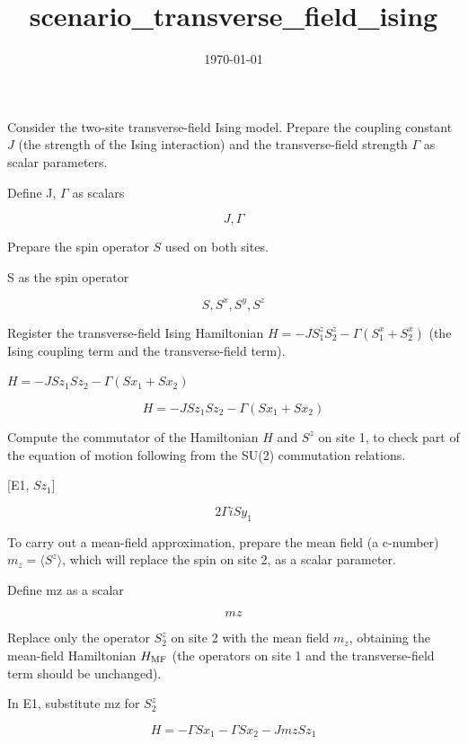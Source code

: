 \documentclass[dvipdfmx]{article}
\title{scenario\_transverse\_field\_ising}
\date{\today}
\begin{document}
\maketitle

Consider the two-site transverse-field Ising model. Prepare the coupling constant $J$ (the strength of the Ising interaction) and the transverse-field strength $\Gamma$ as scalar parameters.

Define J, $\Gamma$ as scalars

\[
  J, \Gamma
\]

Prepare the spin operator $S$ used on both sites.

S as the spin operator

\[
  S, S^{x}, S^{y}, S^{z}
\]

Register the transverse-field Ising Hamiltonian $H=-JS^z_1S^z_2-\Gamma(S^x_1+S^x_2)$ (the Ising coupling term and the transverse-field term).

$H = -J Sz_1 Sz_2 - \Gamma (Sx_1 + Sx_2)$

\begin{equation}
  H = -J Sz_1 Sz_2 - \Gamma (Sx_1 + Sx_2)
  \label{eq:E1}
\end{equation}

Compute the commutator of the Hamiltonian $H$ and $S^z$ on site 1, to check part of the equation of motion following from the SU(2) commutation relations.

[E1, $Sz_1$]

\begin{equation}
  2 \Gamma \mathit{i} Sy_1
  \label{eq:E2}
\end{equation}

To carry out a mean-field approximation, prepare the mean field (a c-number) $m_z=\langle S^z\rangle$, which will replace the spin on site 2, as a scalar parameter.

Define mz as a scalar

\[
  mz
\]

Replace only the operator $S^z_2$ on site 2 with the mean field $m_z$, obtaining the mean-field Hamiltonian $H_{\rm MF}$ (the operators on site 1 and the transverse-field term should be unchanged).

In E1, substitute mz for $S^z_2$

\begin{equation}
  H = - \Gamma Sx_1 - \Gamma Sx_2 - J mz Sz_1
  \label{eq:E3}
\end{equation}
\end{document}
